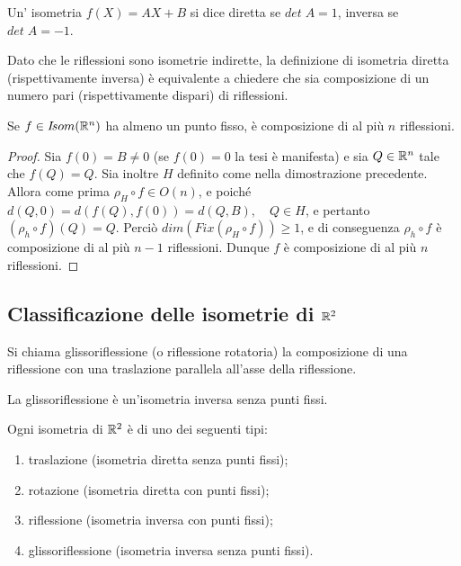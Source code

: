  \begin{definition}
	Un' isometria $f(X)=AX+B$ si dice diretta se $det\; A=1$, inversa se $det\; A=-1$.
 \end{definition}
 
 \begin{remark}
	Dato che le riflessioni sono isometrie indirette, la definizione di isometria diretta (rispettivamente inversa)
	è equivalente a chiedere che sia composizione di un numero pari (rispettivamente dispari) di riflessioni.
 \end{remark}

 
 \begin{proposition}
 Se $f\in I\!som( \mathbb R^n)$ ha almeno un punto fisso, è composizione di al più $n$ riflessioni.
 \end{proposition}
 
 \begin{proof}
 Sia $f(0)=B\ne 0$ (se $f(0)=0$ la tesi è manifesta) e sia $Q\in \mathbb R^n$ tale che $f(Q)=Q$. Sia inoltre $H$ definito
 come nella dimostrazione precedente. Allora come prima $\rho_H\circ f\in O(n)$, e poiché $d(Q,0)=d(f(Q),f(0))=d(Q,B),\quad Q\in H$,
 e pertanto $(\rho_h\circ f)(Q)=Q$. Perciò $dim(Fix(\rho_H\circ f))\ge 1$, e di conseguenza $\rho_h\circ f$
 è composizione di al più $n-1$ riflessioni. Dunque $f$ è composizione di al più $n$ riflessioni.
 \end{proof}

	\subsection{Classificazione delle isometrie di $\mathbb R^2$}
 
 
 \begin{definition}[Glissoriflessione]
	Si chiama glissoriflessione (o riflessione rotatoria) la composizione di una riflessione con una traslazione parallela
	all'asse della riflessione.
 \end{definition}
 
 \begin{remark}
	La glissoriflessione è un'isometria inversa senza punti fissi.
 \end{remark}
 
 \begin{theorem}
 
Ogni isometria di $\mathbb R^2$ è di uno dei seguenti tipi:
 \begin{enumerate}[label=\bf\Roman*)]
  \item traslazione (isometria diretta senza punti fissi);
  \item rotazione (isometria diretta con punti fissi);
  \item riflessione (isometria inversa con punti fissi);
  \item glissoriflessione (isometria inversa senza punti fissi).
 \end{enumerate} 
 \end{theorem}
 
